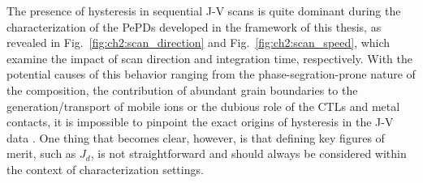 The presence of hysteresis in sequential J-V scans is quite dominant during the characterization of the PePDs developed in the framework of this thesis, as revealed in Fig.~\ref{fig:ch2:scan_direction} and Fig.~\ref{fig:ch2:scan_speed}, which examine the impact of scan direction and integration time, respectively. With the potential causes of this behavior ranging from the phase-segration-prone nature of the  composition, the contribution of abundant grain boundaries to the generation/transport of mobile ions or the dubious role of the CTLs and metal contacts, it is impossible to pinpoint the exact origins of hysteresis in the J-V data \cite{Ghasemi2023APerovskites, Shao2016GrainFilms, Yun2016CriticalCells, Meggiolaro2019FormationPerovskites, Aristidou2017FastCells, Barker2017Defect-AssistedFilms,Li2018InorganicCells,Ighodalo2023NegligiblePerovskites}. One thing that becomes clear, however, is that defining key figures of merit, such as $J_d$, is not straightforward and should always be considered within the context of characterization settings.

